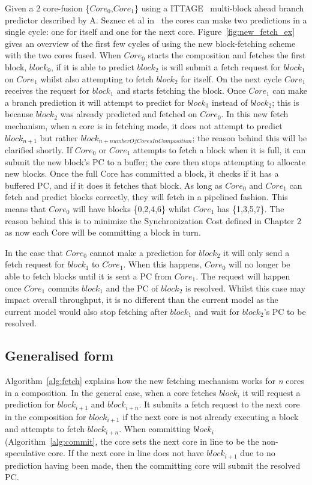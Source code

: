 Given a 2 core-fusion \{$Core_0$,$Core_1$\} using a ITTAGE~\cite{SeznecITTAGE} multi-block ahead branch predictor described by A. Seznec et al in~\cite{SeseznecMultipleBlock} the cores can make two predictions in a single cycle: one for itself and one for the next core.
Figure~\ref{fig:new_fetch_ex} gives an overview of the first few cycles of using the new block-fetching scheme with the two cores fused.
When $Core_0$ starts the composition and fetches the first block, $block_0$, if it is able to predict $block_2$ is will submit a fetch request for $block_1$ on $Core_1$ whilst also attempting to fetch $block_2$ for itself.
On the next cycle $Core_1$ receives the request for $block_1$ and starts fetching the block.
Once $Core_1$ can make a branch prediction it will attempt to predict for $block_3$ instead of $block_2$; this is because $block_2$ was already predicted and fetched on $Core_0$.
In this new fetch mechanism, when a core is in fetching mode, it does not attempt to predict $block_{n+1}$ but rather $block_{n+numberOfCoresInComposition}$; the reason behind this will be clarified shortly.
If $Core_0$ or $Core_1$ attempts to fetch a block when it is full, it can submit the new block's PC to a buffer; the core then stops attempting to allocate new blocks.
Once the full Core has committed a block, it checks if it has a buffered PC, and if it does it fetches that block.
As long as $Core_0$ and $Core_1$ can fetch and predict blocks correctly, they will fetch in a pipelined fashion.
This means that $Core_0$ will have blocks \{0,2,4,6\} whilst $Core_1$ has \{1,3,5,7\}.
The reason behind this is to minimize the Synchronization Cost defined in Chapter 2 as now each Core will be committing a block in turn.

In the case that $Core_0$ cannot make a prediction for $block_2$ it will only send a fetch request for $block_1$ to $Core_1$.
When this happens, $Core_0$ will no longer be able to fetch blocks until it is sent a PC from $Core_1$.
The request will happen once $Core_1$ commits $block_1$ and the PC of $block_2$ is resolved.
Whilst this case may impact overall throughput, it is no different than the current model as the current model would also stop fetching after $block_1$ and wait for $block_2$'s PC to be resolved.

\subsection{Generalised form}

Algorithm~\ref{alg:fetch} explains how the new fetching mechanism works for \textit{n} cores in a composition.
In the general case, when a core fetches $block_i$ it will request a prediction for $block_{i+1}$ and $block_{i+n}$.
It submits a fetch request to the next core in the composition for $block_{i+1}$ if the next core is not already executing a block and attempts to fetch $block_{i+n}$.
When committing $block_i$ (Algorithm~\ref{alg:commit}, the core sets the next core in line to be the non-speculative core.
If the next core in line does not have $block_{i+1}$ due to no prediction having been made, then the committing core will submit the resolved PC.

